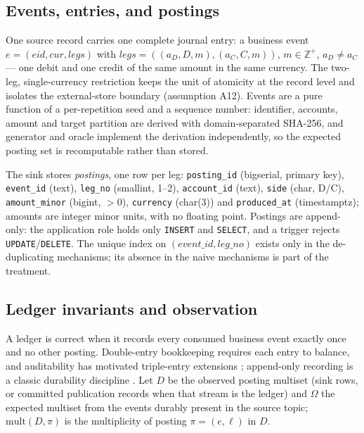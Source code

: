 \subsection{Events, entries, and postings}
\label{sec:model:schema}

One source record carries one complete journal entry: a business event
$e=(\mathit{eid},\mathit{cur},\mathit{legs})$ with $\mathit{legs}=((a_D,D,m),(a_C,C,m))$,
$m\in\mathbb{Z}^{+}$, $a_D\neq a_C$ --- one debit and one credit of the same amount in the same
currency. The two-leg, single-currency restriction keeps the unit of atomicity at the record
level and isolates the external-store boundary (assumption A12). Events are a pure function of a
per-repetition seed and a sequence number: identifier, accounts, amount and target partition are
derived with domain-separated SHA-256, and generator and oracle implement the derivation
independently, so the expected posting set is recomputable rather than stored.

The sink stores \emph{postings}, one row per leg: \texttt{posting\_id} (bigserial, primary
key), \texttt{event\_id} (text), \texttt{leg\_no} (smallint, 1--2), \texttt{account\_id}
(text), \texttt{side} (char, D/C), \texttt{amount\_minor} (bigint, $>0$), \texttt{currency}
(char(3)) and \texttt{produced\_at} (timestamptz); amounts are integer minor units, with no
floating point. Postings are append-only: the application role holds only \texttt{INSERT} and
\texttt{SELECT}, and a trigger rejects \texttt{UPDATE}/\texttt{DELETE}. The unique index on
$(\mathit{event\_id},\mathit{leg\_no})$ exists only in the de-duplicating mechanisms; its absence
in the naive mechanisms is part of the treatment.

\subsection{Ledger invariants and observation}
\label{sec:model:invariants}

A ledger is correct when it records every consumed business event exactly once and no other
posting. Double-entry bookkeeping requires each entry to balance, and auditability has motivated
triple-entry extensions \cite{triple2019,triple2021}; append-only recording is a classic
durability discipline \cite{lsfs1992}. Let $D$ be the observed posting multiset (sink rows, or
committed publication records when that stream is the ledger) and $\Omega$ the expected multiset
from the events durably present in the source topic; $\mathrm{mult}(D,\pi)$ is the multiplicity
of posting $\pi=(e,\ell)$ in $D$.

